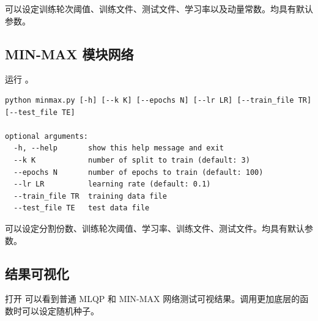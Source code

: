     可以设定训练轮次阈值、训练文件、测试文件、学习率以及动量常数。均具有默认参数。

    \subsection{MIN-MAX 模块网络}
    运行 。

    \begin{lstlisting}[style=commandshell]
python minmax.py [-h] [--k K] [--epochs N] [--lr LR] [--train_file TR] [--test_file TE]

optional arguments:
  -h, --help       show this help message and exit
  --k K            number of split to train (default: 3)
  --epochs N       number of epochs to train (default: 100)
  --lr LR          learning rate (default: 0.1)
  --train_file TR  training data file
  --test_file TE   test data file
    \end{lstlisting}

    可以设定分割份数、训练轮次阈值、学习率、训练文件、测试文件。均具有默认参数。

    \subsection{结果可视化}

    打开  可以看到普通 MLQP 和 MIN-MAX 网络测试可视结果。调用更加底层的函数时可以设定随机种子。
